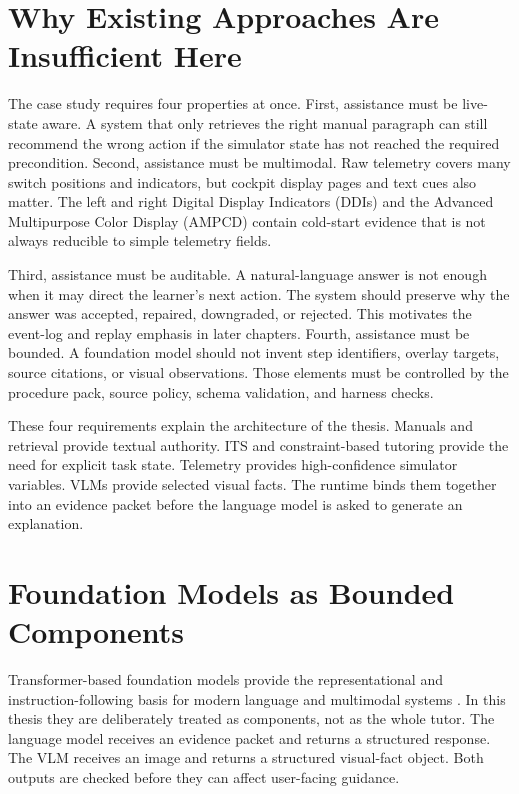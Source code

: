 \section{Why Existing Approaches Are Insufficient Here}\label{sec:bg-gap}

The case study requires four properties at once. First, assistance must be
live-state aware. A system that only retrieves the right manual paragraph can
still recommend the wrong action if the simulator state has not reached the
required precondition. Second, assistance must be multimodal. Raw telemetry
covers many switch positions and indicators, but cockpit display pages and text cues
also matter. The left and right Digital Display Indicators (DDIs) and the
Advanced Multipurpose Color Display (AMPCD) contain cold-start evidence that
is not always reducible to simple telemetry fields.

Third, assistance must be auditable. A natural-language answer is not enough
when it may direct the learner's next action. The system should preserve why
the answer was accepted, repaired, downgraded, or rejected. This motivates the
event-log and replay emphasis in later chapters. Fourth, assistance must be
bounded. A foundation model should not invent step identifiers, overlay
targets, source citations, or visual observations. Those elements must be
controlled by the procedure pack, source policy, schema validation, and
harness checks.

These four requirements explain the architecture of the thesis. Manuals and
retrieval provide textual authority. ITS and constraint-based tutoring provide
the need for explicit task state. Telemetry provides high-confidence simulator
variables. VLMs provide selected visual facts. The runtime binds them together
into an evidence packet before the language model is asked to generate an
explanation.

\section{Foundation Models as Bounded Components}\label{sec:bg-foundation}

Transformer-based foundation models provide the representational and
instruction-following basis for modern language and multimodal systems
\citep{vaswani2017attention}. In this thesis they are deliberately treated as
components, not as the whole tutor. The language model receives an evidence
packet and returns a structured response. The VLM receives an image and returns
a structured visual-fact object. Both outputs are checked before they can
affect user-facing guidance.

